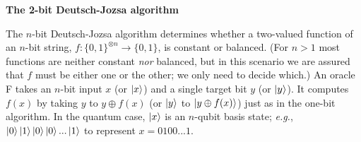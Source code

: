 \documentclass[12pt,letterpaper,boxed,cm]{hmcpset}
\begin{document}

\begin{problem}[1.]
    \textbf{The 2-bit Deutsch-Jozsa algorithm}
     
    The $n$-bit Deutsch-Jozsa algorithm determines whether a two-valued function of an $n$-bit string, $f:\{0,1\}^{\otimes n} \rightarrow \{0,1\}$, is constant or balanced.  (For $n>1$ most functions are neither constant \textit{nor} balanced, but in this scenario we are assured that $f$ must be either one or the other; we only need to decide which.)  An oracle F takes an $n$-bit input $x$ (or $\ket{x}$) and a single target bit $y$ (or $\ket{y}$).  It computes $f(x)$ by taking $y$ to $y \oplus f(x)$ (or $\ket{y}$ to $\ket{y \oplus f(x)}$) just as in the one-bit algorithm.  In the quantum case, $\ket{x}$ is an $n$-qubit basis state; \textit{e.g.}, $\ket{0}\ket{1}\ket{0}\ket{0}...\ket{1}$ to represent $x=0100...1$.\\


\end{problem}
\end{document}
